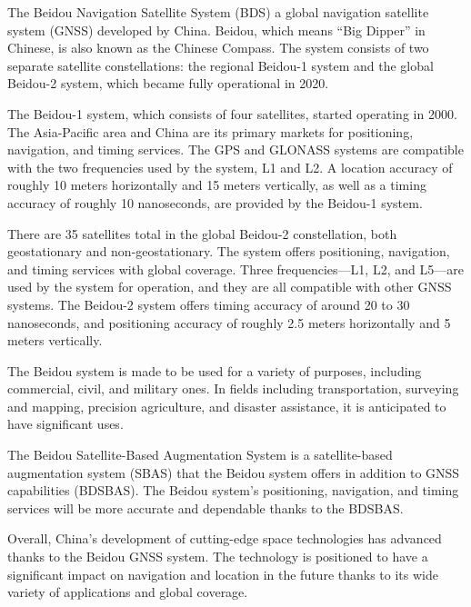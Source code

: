 
The Beidou Navigation Satellite System (BDS) \cite{beidou} a global navigation satellite system (GNSS) developed by China. Beidou, which means “Big Dipper” in Chinese, is also known as the Chinese Compass. The system consists of two separate satellite constellations: the regional Beidou-1 system and the global Beidou-2 system, which became fully operational in 2020.

The Beidou-1 system, which consists of four satellites, started operating in 2000. The Asia-Pacific area and China are its primary markets for positioning, navigation, and timing services. The GPS and GLONASS systems are compatible with the two frequencies used by the system, L1 and L2. A location accuracy of roughly 10 meters horizontally and 15 meters vertically, as well as a timing accuracy of roughly 10 nanoseconds, are provided by the Beidou-1 system.

There are 35 satellites total in the global Beidou-2 constellation, both geostationary and non-geostationary. The system offers positioning, navigation, and timing services with global coverage. Three frequencies—L1, L2, and L5—are used by the system for operation, and they are all compatible with other GNSS systems. The Beidou-2 system offers timing accuracy of around 20 to 30 nanoseconds, and positioning accuracy of roughly 2.5 meters horizontally and 5 meters vertically.

The Beidou system is made to be used for a variety of purposes, including commercial, civil, and military ones. In fields including transportation, surveying and mapping, precision agriculture, and disaster assistance, it is anticipated to have significant uses.

The Beidou Satellite-Based Augmentation System is a satellite-based augmentation system (SBAS) that the Beidou system offers in addition to GNSS capabilities (BDSBAS). The Beidou system's positioning, navigation, and timing services will be more accurate and dependable thanks to the BDSBAS.

Overall, China's development of cutting-edge space technologies has advanced thanks to the Beidou GNSS system. The technology is positioned to have a significant impact on navigation and location in the future thanks to its wide variety of applications and global coverage.

